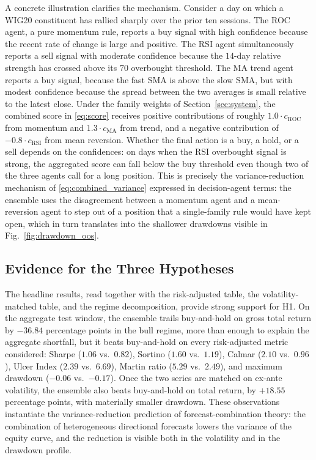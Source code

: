 \documentclass{ieeeaccess}
\newcommand{\Shtest}{\ensuremath{1.06}}
\newcommand{\MDDtest}{\ensuremath{-0.06}}
\newcommand{\Calmtest}{\ensuremath{2.10}}
\newcommand{\BHsharpe}{\ensuremath{0.82}}
\newcommand{\MDDbh}{\ensuremath{-0.17}}
\newcommand{\Calmbh}{\ensuremath{0.96}}
\newcommand{\EnsSortino}{\ensuremath{1.60}}
\newcommand{\BHSortino}{\ensuremath{1.19}}
\newcommand{\EnsUlcer}{\ensuremath{2.39}}
\newcommand{\BHUlcer}{\ensuremath{6.69}}
\newcommand{\EnsMartin}{\ensuremath{5.29}}
\newcommand{\BHMartin}{\ensuremath{2.49}}
\newcommand{\VolScaledExcessPP}{\ensuremath{+18.55}}
\newcommand{\BullShortfallPP}{\ensuremath{-36.84}}
\begin{document}
A concrete illustration clarifies the mechanism. Consider a day on which a WIG20 constituent has rallied sharply over the prior ten sessions. The ROC agent, a pure momentum rule, reports a buy signal with high confidence because the recent rate of change is large and positive. The RSI agent simultaneously reports a sell signal with moderate confidence because the $14$-day relative strength has crossed above its $70$ overbought threshold. The MA trend agent reports a buy signal, because the fast SMA is above the slow SMA, but with modest confidence because the spread between the two averages is small relative to the latest close. Under the family weights of Section~\ref{sec:system}, the combined score in \eqref{eq:score} receives positive contributions of roughly $1.0 \cdot c_\text{ROC}$ from momentum and $1.3 \cdot c_\text{MA}$ from trend, and a negative contribution of $-0.8 \cdot c_\text{RSI}$ from mean reversion. Whether the final action is a buy, a hold, or a sell depends on the confidences: on days when the RSI overbought signal is strong, the aggregated score can fall below the buy threshold even though two of the three agents call for a long position. This is precisely the variance-reduction mechanism of \eqref{eq:combined_variance} expressed in decision-agent terms: the ensemble uses the disagreement between a momentum agent and a mean-reversion agent to step out of a position that a single-family rule would have kept open, which in turn translates into the shallower drawdowns visible in Fig.~\ref{fig:drawdown_oos}.

\subsection{Evidence for the Three Hypotheses}

The headline results, read together with the risk-adjusted table, the volatility-matched table, and the regime decomposition, provide strong support for H1. On the aggregate test window, the ensemble trails buy-and-hold on gross total return by $\BullShortfallPP{}$ percentage points in the bull regime, more than enough to explain the aggregate shortfall, but it beats buy-and-hold on every risk-adjusted metric considered: Sharpe ($\Shtest{}$ vs.\ $\BHsharpe{}$), Sortino ($\EnsSortino{}$ vs.\ $\BHSortino{}$), Calmar ($\Calmtest{}$ vs.\ $\Calmbh{}$), Ulcer Index ($\EnsUlcer{}$ vs.\ $\BHUlcer{}$), Martin ratio ($\EnsMartin{}$ vs.\ $\BHMartin{}$), and maximum drawdown ($\MDDtest{}$ vs.\ $\MDDbh{}$). Once the two series are matched on ex-ante volatility, the ensemble also beats buy-and-hold on total return, by $\VolScaledExcessPP{}$ percentage points, with materially smaller drawdown. These observations instantiate the variance-reduction prediction of forecast-combination theory: the combination of heterogeneous directional forecasts lowers the variance of the equity curve, and the reduction is visible both in the volatility and in the drawdown profile.
\end{document}
